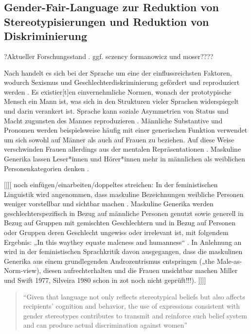 \documentclass[12pt, 
    twoside=false, 
    bibliography=totoc, 
    numbers=endperiod, 
    headings=normal, 
    toc=chapterentrydotfill
    ]{scrbook}
\begin{document}
\subsection{Gender-Fair-Language zur Reduktion von Stereotypisierungen und Reduktion von Diskriminierung}

?Aktueller Forschungsstand . ggf. sczency formanowicz und moser???? 

Nach \textcite{menegatti_2017} handelt es sich bei der Sprache um eine der einflussreichsten Faktoren, wodurch Sexismus und Geschlechterdiskriminierung gefördert und reproduziert werden \parencite*[1]{menegatti_2017}. Es existier[t]en einvernehmliche Normen, wonach der prototypische Mensch ein Mann ist, was sich in den Strukturen vieler Sprachen widerspiegelt und darin verankert ist. Sprache kann soziale Asymmetrien von Status und Macht zugunsten des Mannes reproduzieren \parencite{menegatti_2017}.
Männliche Substantive und Pronomen werden beispielsweise häufig mit einer generischen Funktion verwendet um sich sowohl auf Männer als auch auf Frauen zu beziehen. Auf diese Weise verschwinden Frauen allerdings aus der mentalen Repräsentationen \parencites{vaughan_2018}{stahlberg_2001}. Maskuline Generika lassen Leser*innen und Hörer*innen mehr in männlichen als weiblichen Personenkategorien denken \parencites[2]{sczesny_2016}{stahlberg_2007}.

[[[[
noch einfügen/einarbeiten/doppeltes streichen: 
In der feministischen Linguistik wird angenommen, dass maskuline Bezeichnungen weibliche Personen weniger vorstellbar und sichtbar machen \parencite[131]{stahlberg_2001}. 
Maskuline Generika werden geschlechterspezifisch in Bezug auf männliche Personen genutzt sowie generell in Bezug auf Gruppen mit gemischten Geschlechtern und in Bezug auf Personen oder Gruppen deren Geschlecht ungewiss oder irrelevant ist, mit folgendem Ergebnis: „In this waythey equate maleness and humanness“ \parencite[169]{stahlberg_2007}. 
In Anlehnung an \textcite{stahlberg_2007} wird in der feministischen Sprachkritik davon ausgegangen, dass die maskulinen Generika aus einem grundlegenden Androzentrismus entspringen („the Male-as-Norm-view), diesen aufrechterhalten und die Frauen unsichtbar machen \parencites[170]{stahlberg_2007}{miller_1976}{silveira_1980} Miller und Swift 1977, Silveira 1980 schon in zot noch nicht geprüft!!!).
]]]]

\begin{quote}
    \enquote{Given that language not only reflects stereotypical beliefs but also affects recipients’ cognition and behavior, the use of expressions consistent with gender stereotypes contributes to transmit and reinforce such belief system and can produce actual discrimination against women} \parencite[2]{menegatti_2017}
\end{quote}
\end{document}
